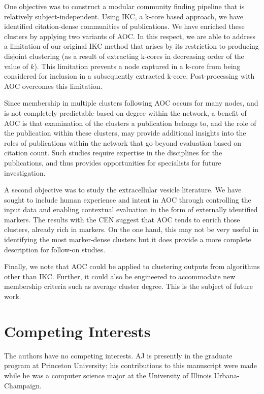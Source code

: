 \documentclass[12pt, oneside]{article}   	%
\begin{document}
{One objective was to construct a modular community finding pipeline that is relatively subject-independent. Using IKC, a k-core based approach, we have identified citation-dense communities of publications. We have enriched these clusters by applying two variants of AOC. In this respect, we are able to address a limitation of our original IKC method that arises by its restriction to producing disjoint clustering (as a result of extracting k-cores in decreasing order of the value of $k$). This limitation prevents a node captured in a k-core from being considered for inclusion in a subsequently extracted k-core. Post-processing with AOC overcomes this limitation.

Since membership in multiple clusters following AOC occurs for many nodes, and is not completely predictable based on degree within the network, a benefit of AOC is that examination of the clusters a publication belongs to, and the role of the publication within these clusters,  may provide additional insights into the roles of publications within the network that go beyond evaluation based on citation count.
Such studies require expertise in the disciplines for the publications, and thus provides opportunities for specialists for future investigation.

A second objective was to study the extracellular vesicle literature. We have sought to include human experience and intent \citep{vonluxburg2012clustering} in AOC through controlling the input data and enabling contextual evaluation in the form of externally identified markers. The results with the CEN suggest that AOC tends to enrich those clusters, already rich in markers. On the one hand, this may not be very useful in identifying the most marker-dense clusters but it does provide a more complete description for follow-on studies. 

Finally, we note that AOC could be applied to clustering  outputs from algorithms other than IKC. Further, it could also be engineered to accommodate new membership criteria such as average cluster degree. This is the subject of future work. 
	
\section*{Competing Interests} \vspace{3mm} The authors have no competing interests. AJ is presently in the graduate program at Princeton University; his contributions to this manuscript were made while he was a computer science major at the University of Illinois Urbana-Champaign.
	
}
\end{document}
